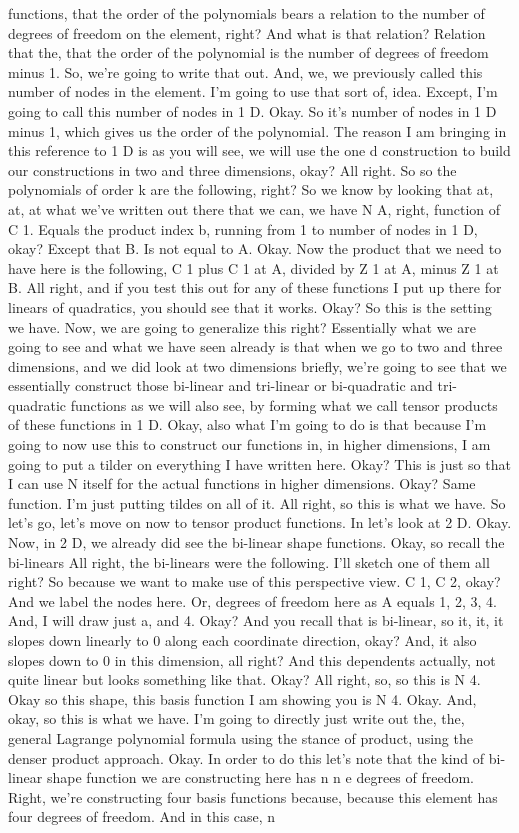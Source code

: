 \documentclass[10pt]{article}
\begin{document}
functions, that the order of the polynomials bears a relation to the number of degrees of freedom on the element, right? And what is that relation? Relation that the, that the order of the polynomial is the number of degrees of freedom minus 1. So, we're going to write that out. And, we, we previously called this number of nodes in the element. I'm going to use that sort of, idea. Except, I'm going to call this number of nodes in 1 D. Okay. So it's number of nodes in 1 D minus 1, which gives us the order of the polynomial. The reason I am bringing in this reference to 1 D is as you will see, we will use the one d construction to build our constructions in two and three dimensions, okay? All right. So so the polynomials of order k are the following, right? So we know by looking that at, at, at what we've written out there that we can, we have N A, right, function of C 1. Equals the product index b, running from 1 to number of nodes in 1 D, okay? Except that B. Is not equal to A. Okay. Now the product that we need to have here is the following, C 1 plus C 1 at A, divided by Z 1 at A, minus Z 1 at B. All right, and if you test this out for any of these functions I put up there for linears of quadratics, you should see that it works. Okay? So this is the setting we have. Now, we are going to generalize this right? Essentially what we are going to see and what we have seen already is that when we go to two and three dimensions, and we did look at two dimensions briefly, we're going to see that we essentially construct those bi-linear and tri-linear or bi-quadratic and tri-quadratic functions as we will also see, by forming what we call tensor products of these functions in 1 D. Okay, also what I'm going to do is that because I'm going to now use this to construct our functions in, in higher dimensions, I am going to put a tilder on everything I have written here. Okay? This is just so that I can use N itself for the actual functions in higher dimensions. Okay? Same function. I'm just putting tildes on all of it. All right, so this is what we have. So let's go, let's move on now to tensor product functions. In let's look at 2 D. Okay. Now, in 2 D, we already did see the bi-linear shape functions. Okay, so recall the bi-linears All right, the bi-linears were the following. I'll sketch one of them all right? So because we want to make use of this perspective view. C 1, C 2, okay? And we label the nodes here. Or, degrees of freedom here as A equals 1, 2, 3, 4. And, I will draw just a, and 4. Okay? And you recall that is bi-linear, so it, it, it slopes down linearly to 0 along each coordinate direction, okay? And, it also slopes down to 0 in this dimension, all right? And this dependents actually, not quite linear but looks something like that. Okay? All right, so, so this is N 4. Okay so this shape, this basis function I am showing you is N 4. Okay. And, okay, so this is what we have. I'm going to directly just write out the, the, general Lagrange polynomial formula using the stance of product, using the denser product approach. Okay. In order to do this let's note that the kind of bi-linear shape function we are constructing here has n n e degrees of freedom. Right, we're constructing four basis functions because, because this element has four degrees of freedom. And in this case, n 
\end{document}
